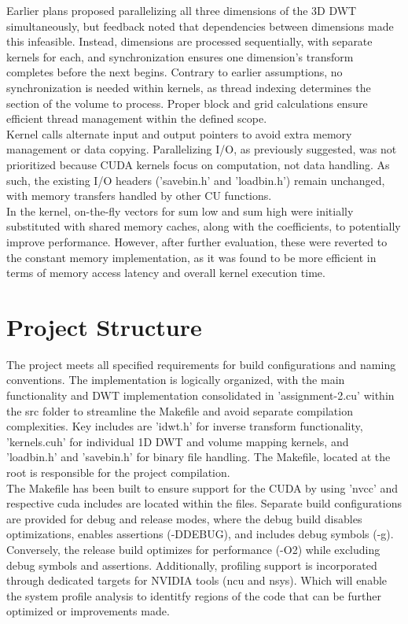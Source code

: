 \documentclass[journal,11pt]{IEEEtran}
\begin{document}
Earlier plans proposed parallelizing all three dimensions of the 3D DWT simultaneously, but feedback noted that dependencies between dimensions made this infeasible. Instead, dimensions are processed sequentially, with separate kernels for each, and synchronization ensures one dimension's transform completes before the next begins. Contrary to earlier assumptions, no synchronization is needed within kernels, as thread indexing determines the section of the volume to process. Proper block and grid calculations ensure efficient thread management within the defined scope.\\

Kernel calls alternate input and output pointers to avoid extra memory management or data copying. Parallelizing I/O, as previously suggested, was not prioritized because CUDA kernels focus on computation, not data handling. As such, the existing I/O headers ('savebin.h' and 'loadbin.h') remain unchanged, with memory transfers handled by other CU functions.\\

In the kernel, on-the-fly vectors for sum low and sum high were initially substituted with shared memory caches, along with the coefficients, to potentially improve performance. However, after further evaluation, these were reverted to the constant memory implementation, as it was found to be more efficient in terms of memory access latency and overall kernel execution time.

\section{Project Structure}
The project meets all specified requirements for build configurations and naming conventions. The implementation is logically organized, with the main functionality and DWT implementation consolidated in 'assignment-2.cu' within the src folder to streamline the Makefile and avoid separate compilation complexities. Key includes are 'idwt.h' for inverse transform functionality, 'kernels.cuh' for individual 1D DWT and volume mapping kernels, and 'loadbin.h' and 'savebin.h' for binary file handling. The Makefile, located at the root is responsible for the project compilation.\\

The Makefile has been built to ensure support for the CUDA by using 'nvcc' and respective cuda includes are located within the files. Separate build configurations are provided for debug and release modes, where the debug build disables optimizations, enables assertions (-DDEBUG), and includes debug symbols (-g). Conversely, the release build optimizes for performance (-O2) while excluding debug symbols and assertions. Additionally, profiling support is incorporated through dedicated targets for NVIDIA tools (ncu and nsys). Which will enable the system profile analysis to identitfy regions of the code that can be further optimized or improvements made.
\end{document}
